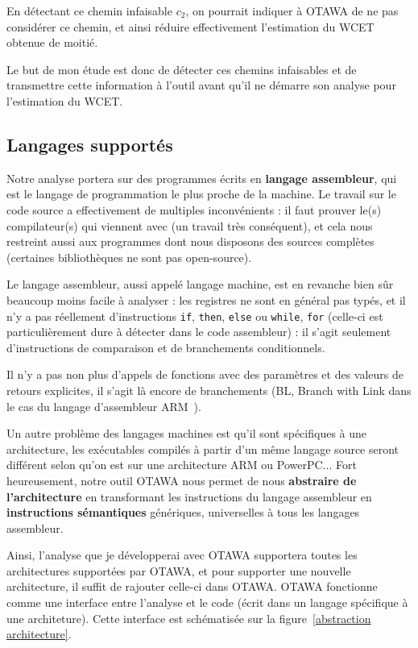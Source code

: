 \documentclass[french]{article}
\begin{document}
  En détectant ce chemin infaisable $c_2$, on pourrait indiquer à OTAWA de ne pas considérer ce chemin, et ainsi réduire effectivement l'estimation du WCET obtenue de moitié.
  
  Le but de mon étude est donc de détecter ces chemins infaisables et de transmettre cette information à l'outil avant qu'il ne démarre son analyse pour l'estimation du WCET.

  
  \subsection{Langages supportés}
  Notre analyse portera sur des programmes écrits en \textbf{langage assembleur}, qui est le langage de programmation le plus proche de la machine. Le travail sur le code source a effectivement de multiples inconvénients : il faut prouver le(s) compilateur(s) qui viennent avec (un travail très conséquent), et cela nous restreint aussi aux programmes dont nous disposons des sources complètes (certaines bibliothèques ne sont pas open-source).
  
  Le langage assembleur, aussi appelé langage machine, est en revanche bien sûr beaucoup moins facile à analyser : les registres ne sont en général pas typés, et il n'y a pas réellement d'instructions \texttt{if}, \texttt{then}, \texttt{else} ou \texttt{while}, \texttt{for} (celle-ci est particulièrement dure à détecter dans le code assembleur) : il s'agit seulement d'instructions de comparaison et de branchements conditionnels. 
  
  Il n'y a pas non plus d'appels de fonctions avec des paramètres et des valeurs de retours explicites, il s'agit là encore de branchements (BL, Branch with Link dans le cas du langage d'assembleur ARM~\cite{ARM instruction set}).
  
  Un autre problème des langages machines est qu'il sont spécifiques à une architecture, les exécutables compilés à partir d'un même langage source seront différent selon qu'on est sur une architecture ARM ou PowerPC... Fort heureusement, notre outil OTAWA nous permet de nous \textbf{abstraire de l'architecture} en transformant les instructions du langage assembleur en \textbf{instructions sémantiques} génériques, universelles à tous les langages assembleur. %
  
  Ainsi, l'analyse que je développerai avec OTAWA supportera toutes les architectures supportées par OTAWA, et pour supporter une nouvelle architecture, il suffit de rajouter celle-ci dans OTAWA. OTAWA fonctionne comme une interface entre l'analyse et le code (écrit dans un langage spécifique à une architeture). Cette interface est schématisée sur la figure~\ref{abstraction architecture}.
  
\end{document}
